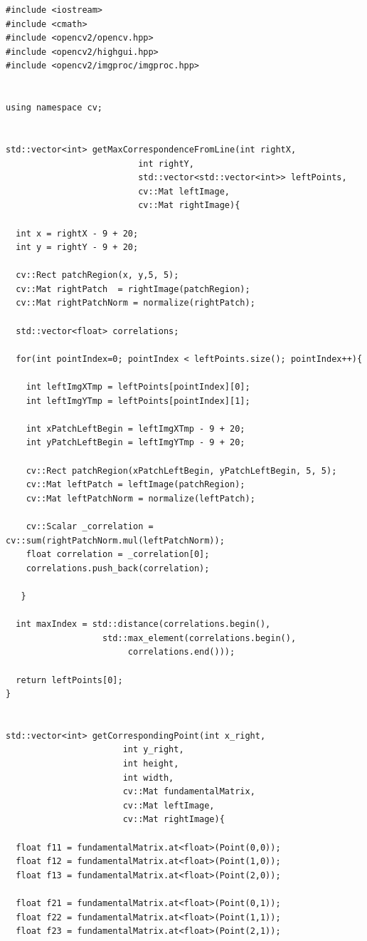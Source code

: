 \documentclass[letterpaper,11pt]{article}
\begin{document}
\begin{verbatim}
#include <iostream>
#include <cmath>
#include <opencv2/opencv.hpp>
#include <opencv2/highgui.hpp>
#include <opencv2/imgproc/imgproc.hpp>


using namespace cv;


std::vector<int> getMaxCorrespondenceFromLine(int rightX,
					      int rightY,
					      std::vector<std::vector<int>> leftPoints,
					      cv::Mat leftImage,
					      cv::Mat rightImage){

  int x = rightX - 9 + 20;
  int y = rightY - 9 + 20;

  cv::Rect patchRegion(x, y,5, 5);
  cv::Mat rightPatch  = rightImage(patchRegion);
  cv::Mat rightPatchNorm = normalize(rightPatch);

  std::vector<float> correlations;

  for(int pointIndex=0; pointIndex < leftPoints.size(); pointIndex++){

    int leftImgXTmp = leftPoints[pointIndex][0];
    int leftImgYTmp = leftPoints[pointIndex][1];

    int xPatchLeftBegin = leftImgXTmp - 9 + 20;
    int yPatchLeftBegin = leftImgYTmp - 9 + 20;

    cv::Rect patchRegion(xPatchLeftBegin, yPatchLeftBegin, 5, 5);
    cv::Mat leftPatch = leftImage(patchRegion);
    cv::Mat leftPatchNorm = normalize(leftPatch);
	  
    cv::Scalar _correlation = cv::sum(rightPatchNorm.mul(leftPatchNorm));
    float correlation = _correlation[0];
    correlations.push_back(correlation);
	
   }

  int maxIndex = std::distance(correlations.begin(),
  			       std::max_element(correlations.begin(),
  						correlations.end()));

  return leftPoints[0];
}


std::vector<int> getCorrespondingPoint(int x_right,
				       int y_right,
				       int height,
				       int width,
				       cv::Mat fundamentalMatrix,
				       cv::Mat leftImage,
				       cv::Mat rightImage){

  float f11 = fundamentalMatrix.at<float>(Point(0,0));
  float f12 = fundamentalMatrix.at<float>(Point(1,0));
  float f13 = fundamentalMatrix.at<float>(Point(2,0));

  float f21 = fundamentalMatrix.at<float>(Point(0,1));
  float f22 = fundamentalMatrix.at<float>(Point(1,1));
  float f23 = fundamentalMatrix.at<float>(Point(2,1));


\end{verbatim}
\end{document}
